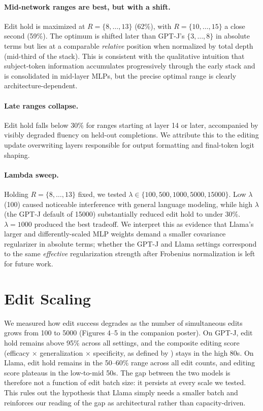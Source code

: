 \paragraph{Mid-network ranges are best, but with a shift.}
Edit hold is maximized at $R = \{8, \dots, 13\}$ (62\%), with $R = \{10, \dots, 15\}$ a close second (59\%). The optimum is shifted later than GPT-J's $\{3, \dots, 8\}$ in absolute terms but lies at a comparable \emph{relative} position when normalized by total depth (mid-third of the stack). This is consistent with the qualitative intuition that subject-token information accumulates progressively through the early stack and is consolidated in mid-layer MLPs, but the precise optimal range is clearly architecture-dependent.

\paragraph{Late ranges collapse.}
Edit hold falls below 30\% for ranges starting at layer 14 or later, accompanied by visibly degraded fluency on held-out completions. We attribute this to the editing update overwriting layers responsible for output formatting and final-token logit shaping.

\paragraph{Lambda sweep.}
Holding $R = \{8, \dots, 13\}$ fixed, we tested $\lambda \in \{100, 500, 1000, 5000, 15000\}$. Low $\lambda$ (100) caused noticeable interference with general language modeling, while high $\lambda$ (the GPT-J default of 15000) substantially reduced edit hold to under 30\%. $\lambda = 1000$ produced the best tradeoff. We interpret this as evidence that Llama's larger and differently-scaled MLP weights demand a smaller covariance regularizer in absolute terms; whether the GPT-J and Llama settings correspond to the same \emph{effective} regularization strength after Frobenius normalization is left for future work.


\section{Edit Scaling}
\label{sec:scaling}
We measured how edit success degrades as the number of simultaneous edits grows from 100 to 5000 (Figures 4--5 in the companion poster). On GPT-J, edit hold remains above 95\% across all settings, and the composite editing score (efficacy $\times$ generalization $\times$ specificity, as defined by \citealp{meng2023masseditingmemorytransformer}) stays in the high 80s. On Llama, edit hold remains in the 50--60\% range across all edit counts, and editing score plateaus in the low-to-mid 50s. The gap between the two models is therefore not a function of edit batch size: it persists at every scale we tested. This rules out the hypothesis that Llama simply needs a smaller batch and reinforces our reading of the gap as architectural rather than capacity-driven.



